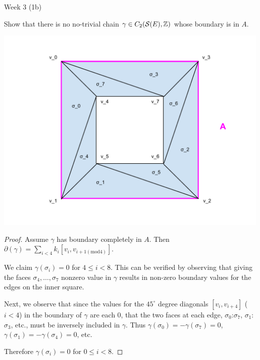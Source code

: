 



  \begin{question}
    Week 3 (1b) 

    Show that there is no no-trivial chain $\gamma\in C_2(\mathcal{S}(E),\mathbb{Z})$ whose boundary is in $A$.
  \end{question}

  \centerline{\includegraphics[width=0.7\linewidth]{alg-top-2013-09-18.pdf}}

  \begin{proof}
    Assume $\gamma$ has boundary completely in $A$. Then $\partial(\gamma)=\sum_{i<4} k_i[v_i,v_{i+1(\text{mod}4)}]$.

    We claim $\gamma(\sigma_i) = 0$ for $4\leq i<8$. This can be verified by observing that giving the faces $\sigma_4,\dots,\sigma_7$ nonzero value in $\gamma$ results in non-zero boundary values for the edges on the inner square.

    Next, we observe that since the values for the $45^\circ$ degree diagonals $[v_i,v_{i+4}]$ ($i<4$) in the boundary of $\gamma$ are each $0$, that the two faces at each edge, $\sigma_0$:$\sigma_7$, $\sigma_1$:$\sigma_3$, etc., must be inversely included in $\gamma$. Thus $\gamma(\sigma_0)=-\gamma(\sigma_7)=0$, $\gamma(\sigma_1)=-\gamma(\sigma_4)=0$, etc.

    Therefore $\gamma(\sigma_i)=0$ for $0\leq i<8$.
  \end{proof}




